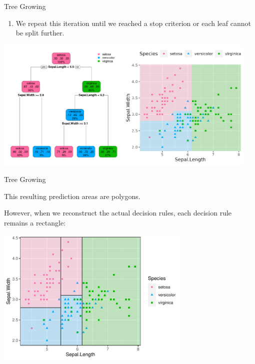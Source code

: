 \documentclass[11pt,compress,t,notes=noshow, xcolor=table]{beamer}
\begin{document}
\begin{vbframe}{Tree Growing}
\begin{enumerate}[4]
\item We repeat this iteration until we reached a stop criterion or each leaf cannot be split further.
\end{enumerate}

\color{fgcolor}

{\centering \includegraphics[width=0.95\textwidth]{figure/tree-classif-depth3.pdf} 

}

\end{vbframe}

\begin{vbframe}{Tree Growing}

This resulting prediction areas are polygons.

However, when we reconstruct the actual decision rules, each decision rule remains a rectangle:

\color{fgcolor}

{\centering \includegraphics[width=0.7\textwidth]{figure/tree-depth3-area-withblacklines.pdf} 

}

\end{vbframe}
\end{document}
